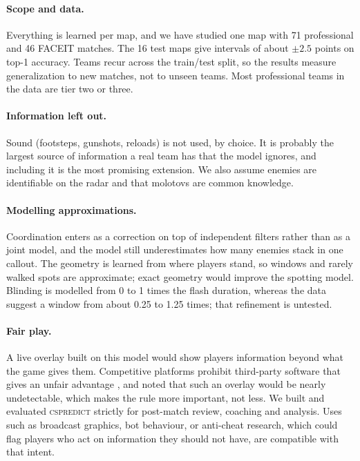 \documentclass[11pt]{article}
\newcommand{\cs}{\textsc{cspredict}}
\newcommand{\1}{\mathbb{1}}
\begin{document}
\paragraph{Scope and data.} Everything is learned per map, and we have studied one map with 71 professional and 46 FACEIT matches. The 16 test maps give intervals of about $\pm 2.5$ points on top-1 accuracy. Teams recur across the train/test split, so the results measure generalization to new matches, not to unseen teams. Most professional teams in the data are tier two or three.

\paragraph{Information left out.} Sound (footsteps, gunshots, reloads) is not used, by choice. It is probably the largest source of information a real team has that the model ignores, and including it is the most promising extension. We also assume enemies are identifiable on the radar and that molotovs are common knowledge.

\paragraph{Modelling approximations.} Coordination enters as a correction on top of independent filters rather than as a joint model, and the model still underestimates how many enemies stack in one callout. The geometry is learned from where players stand, so windows and rarely walked spots are approximate; exact geometry would improve the spotting model. Blinding is modelled from 0 to 1 times the flash duration, whereas the data suggest a window from about 0.25 to 1.25 times; that refinement is untested.

\paragraph{Fair play.} A live overlay built on this model would show players information beyond what the game gives them. Competitive platforms prohibit third-party software that gives an unfair advantage \citep{faceit2026cheat}, and \citet{hladky2008evaluation} noted that such an overlay would be nearly undetectable, which makes the rule more important, not less. We built and evaluated \cs{} strictly for post-match review, coaching and analysis. Uses such as broadcast graphics, bot behaviour, or anti-cheat research, which could flag players who act on information they should not have, are compatible with that intent.
\end{document}
